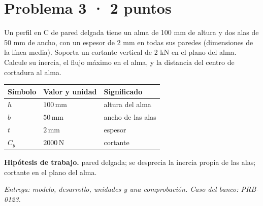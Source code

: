 \par\medskip\noindent\begin{minipage}{\linewidth}

\section{Problema 3 · 2 puntos}

Un perfil en C de pared delgada tiene un alma de 100 mm de altura y dos alas de 50 mm de ancho, con un espesor de 2 mm en todas sus paredes (dimensiones de la línea media). Soporta un cortante vertical de 2 kN en el plano del alma. Calcule su inercia, el flujo máximo en el alma, y la distancia del centro de cortadura al alma.

\par\medskip\noindent\begin{tabular}{@{}p{.18\linewidth}p{.26\linewidth}p{.48\linewidth}@{}}
\toprule Símbolo & Valor y unidad & Significado\\\midrule
$h$ & $100\,\mathrm{mm}$ & altura del alma\\
$b$ & $50\,\mathrm{mm}$ & ancho de las alas\\
$t$ & $2\,\mathrm{mm}$ & espesor\\
$C_{y}$ & $2000\,\mathrm{N}$ & cortante\\
\bottomrule\end{tabular}\par\medskip



\par\textbf{Hipótesis de trabajo.} pared delgada; se desprecia la inercia propia de las alas; cortante en el plano del alma.

\par\textit{Entrega: modelo, desarrollo, unidades y una comprobación. Caso del banco: PRB-0123.}\end{minipage}\par\medskip


